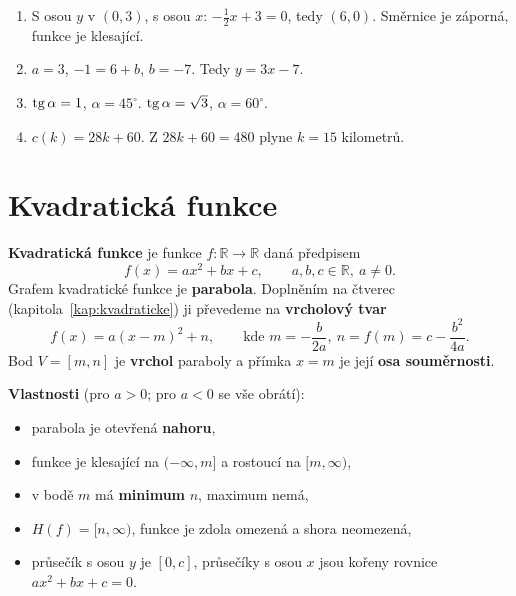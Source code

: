 \begin{solution}
  \begin{enumerate}[label=(\alph*)]
    \item S osou $y$ v $(0, 3)$, s osou $x$: $-\frac{1}{2}x + 3 = 0$, tedy $(6, 0)$. Směrnice je záporná, funkce je klesající.
    \item $a = 3$, $-1 = 6 + b$, $b = -7$. Tedy $y = 3x - 7$.
    \item $\operatorname{tg}\alpha = 1$, $\alpha = 45^\circ$. $\operatorname{tg}\alpha = \sqrt{3}$, $\alpha = 60^\circ$.
    \item $c(k) = 28k + 60$. Z $28k + 60 = 480$ plyne $k = 15$ kilometrů.
  \end{enumerate}
\end{solution}

\section{Kvadratická funkce}\label{sec:kvadraticka-funkce}

\begin{definitionbox}
  \textbf{Kvadratická funkce} je funkce $f: \mathbb{R}\to\mathbb{R}$ daná předpisem
  \begin{equation*}
    f(x) = ax^2 + bx + c,\qquad a, b, c\in\mathbb{R},\ a\neq 0.
  \end{equation*}
  Grafem kvadratické funkce je \textbf{parabola}. Doplněním na čtverec (kapitola~\ref{kap:kvadraticke}) ji převedeme na \textbf{vrcholový tvar}
  \begin{equation*}
    f(x) = a{(x - m)}^2 + n,\qquad\text{kde } m = -\frac{b}{2a},\ n = f(m) = c - \frac{b^2}{4a}.
  \end{equation*}
  Bod $V = [m, n]$ je \textbf{vrchol} paraboly a přímka $x = m$ je její \textbf{osa souměrnosti}.

  \vspace{0.2cm}

  \textbf{Vlastnosti} (pro $a > 0$; pro $a < 0$ se vše obrátí):
  \begin{itemize}
    \item parabola je otevřená \textbf{nahoru},
    \item funkce je klesající na $(-\infty, m]$ a rostoucí na $[m, \infty)$,
    \item v bodě $m$ má \textbf{minimum} $n$, maximum nemá,
    \item $H(f) = [n, \infty)$, funkce je zdola omezená a shora neomezená,
    \item průsečík s osou $y$ je $[0, c]$, průsečíky s osou $x$ jsou kořeny rovnice $ax^2 + bx + c = 0$.
  \end{itemize}
\end{definitionbox}

